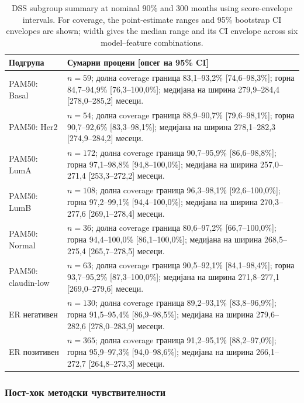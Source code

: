 \documentclass[12pt]{article}
\begin{document}
\begin{table}[ht]
\centering
\caption{DSS subgroup summary at nominal 90\% and 300 months using score-envelope intervals. For coverage, the point-estimate ranges and 95\% bootstrap CI envelopes are shown; width gives the median range and its CI envelope across six model--feature combinations.}
\label{tab:dss-subgroup-summary}
\small
\begin{tabular}{p{}p{}}
\hline
Подгрупа & Сумарни процени [опсег на 95\% CI] \\
\hline
PAM50: Basal & $n=59$; долна coverage граница 83,1--93,2\% [74,6--98,3\%]; горна 84,7--94,9\% [76,3--100,0\%]; медијана на ширина 279,9--284,4 [278,0--285,2] месеци. \\
PAM50: Her2 & $n=54$; долна coverage граница 88,9--90,7\% [79,6--98,1\%]; горна 90,7--92,6\% [83,3--98,1\%]; медијана на ширина 278,1--282,3 [274,9--284,2] месеци. \\
PAM50: LumA & $n=172$; долна coverage граница 90,7--95,9\% [86,6--98,8\%]; горна 97,1--98,8\% [94,8--100,0\%]; медијана на ширина 257,0--271,4 [253,3--272,2] месеци. \\
PAM50: LumB & $n=108$; долна coverage граница 96,3--98,1\% [92,6--100,0\%]; горна 97,2--99,1\% [94,4--100,0\%]; медијана на ширина 270,3--277,6 [269,1--278,4] месеци. \\
PAM50: Normal & $n=36$; долна coverage граница 80,6--97,2\% [66,7--100,0\%]; горна 94,4--100,0\% [86,1--100,0\%]; медијана на ширина 268,5--275,4 [265,7--278,5] месеци. \\
PAM50: claudin-low & $n=63$; долна coverage граница 90,5--92,1\% [84,1--98,4\%]; горна 93,7--95,2\% [87,3--100,0\%]; медијана на ширина 271,8--277,1 [269,0--279,6] месеци. \\
ER негативен & $n=130$; долна coverage граница 89,2--93,1\% [83,8--96,9\%]; горна 91,5--95,4\% [86,9--98,5\%]; медијана на ширина 279,6--282,6 [278,0--283,9] месеци. \\
ER позитивен & $n=365$; долна coverage граница 91,2--95,1\% [88,2--97,0\%]; горна 95,9--97,3\% [94,0--98,6\%]; медијана на ширина 266,1--272,7 [264,8--273,3] месеци. \\
\hline
\end{tabular}
\end{table}
\subsubsection{Пост-хок методски чувствителности}
\end{document}

